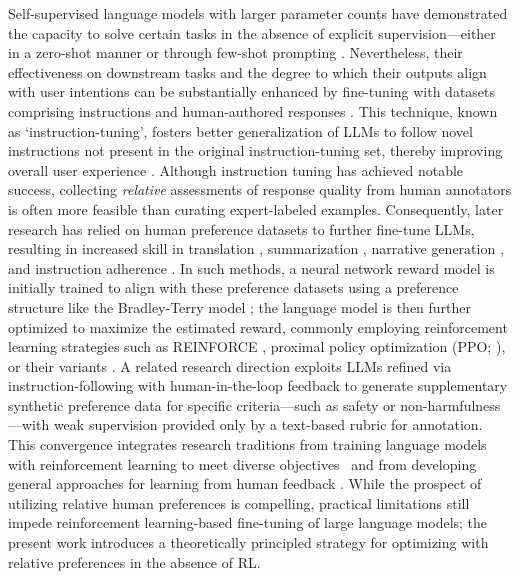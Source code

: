 Self-supervised language models with larger parameter counts have demonstrated the capacity to solve certain tasks in the absence of explicit supervision—either in a zero-shot manner \citep{radford2019language} or through few-shot prompting \citep{gpt3,megatron,chowdhery2022palm}. Nevertheless, their effectiveness on downstream tasks and the degree to which their outputs align with user intentions can be substantially enhanced by fine-tuning with datasets comprising instructions and human-authored responses \citep{mishra-etal-2022-cross,sanh2022multitask,chung2022scaling,thoppilan2022lamda}. This technique, known as ‘instruction-tuning’, fosters better generalization of LLMs to follow novel instructions not present in the original instruction-tuning set, thereby improving overall user experience \citep{chung2022scaling}. Although instruction tuning has achieved notable success, collecting \textit{relative} assessments of response quality from human annotators is often more feasible than curating expert-labeled examples. Consequently, later research has relied on human preference datasets to further fine-tune LLMs, resulting in increased skill in translation \citep{kreutzer-etal-2018-reliability}, summarization \citep{stiennon2022learning,ziegler2020finetuning}, narrative generation \citep{ziegler2020finetuning}, and instruction adherence \citep{ouyang2022training,ramamurthy2023is}. In such methods, a neural network reward model is initially trained to align with these preference datasets using a preference structure like the Bradley-Terry model \citep{bradley1952rankanalysis}; the language model is then further optimized to maximize the estimated reward, commonly employing reinforcement learning strategies such as REINFORCE \citep{williams1992reinforce}, proximal policy optimization (PPO; \cite{schulman2017proximal}), or their variants \citep{ramamurthy2023is}. A related research direction exploits LLMs refined via instruction-following with human-in-the-loop feedback to generate supplementary synthetic preference data for specific criteria—such as safety or non-harmfulness \citep{bai2022constitutional}—with weak supervision provided only by a text-based rubric for annotation. This convergence integrates research traditions from training language models with reinforcement learning to meet diverse objectives~\citep{Ranzato2015SequenceLT,paulus2018a,wu2018learning} and from developing general approaches for learning from human feedback \citep{christiano2017deep,kupcsik2018learning}. While the prospect of utilizing relative human preferences is compelling, practical limitations still impede reinforcement learning-based fine-tuning of large language models; the present work introduces a theoretically principled strategy for optimizing with relative preferences in the absence of RL.

